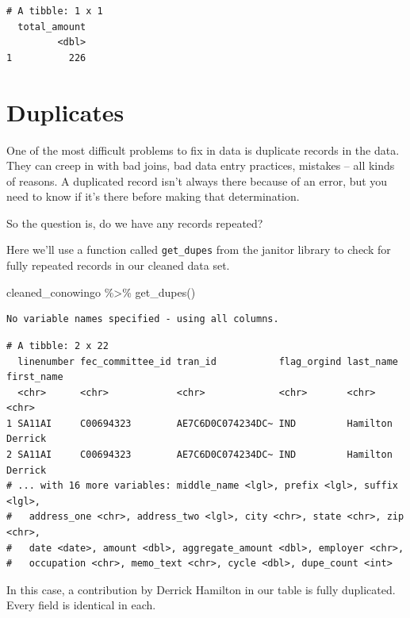 \documentclass[
  letterpaper,
  DIV=11,
  numbers=noendperiod]{scrreprt}
\newenvironment{Shaded}{\begin{snugshade}}{\end{snugshade}}
\newcommand{\FunctionTok}[1]{\textcolor[rgb]{0.28,0.35,0.67}{#1}}
\newcommand{\NormalTok}[1]{\textcolor[rgb]{0.00,0.23,0.31}{#1}}
\newcommand{\SpecialCharTok}[1]{\textcolor[rgb]{0.37,0.37,0.37}{#1}}
\begin{document}
\begin{verbatim}
# A tibble: 1 x 1
  total_amount
         <dbl>
1          226
\end{verbatim}

\hypertarget{duplicates}{%
\section{Duplicates}\label{duplicates}}

One of the most difficult problems to fix in data is duplicate records
in the data. They can creep in with bad joins, bad data entry practices,
mistakes -- all kinds of reasons. A duplicated record isn't always there
because of an error, but you need to know if it's there before making
that determination.

So the question is, do we have any records repeated?

Here we'll use a function called \texttt{get\_dupes} from the janitor
library to check for fully repeated records in our cleaned data set.

\begin{Shaded}
\begin{Highlighting}[]
\NormalTok{cleaned\_conowingo }\SpecialCharTok{\%\textgreater{}\%} 
  \FunctionTok{get\_dupes}\NormalTok{()}
\end{Highlighting}
\end{Shaded}

\begin{verbatim}
No variable names specified - using all columns.
\end{verbatim}

\begin{verbatim}
# A tibble: 2 x 22
  linenumber fec_committee_id tran_id           flag_orgind last_name first_name
  <chr>      <chr>            <chr>             <chr>       <chr>     <chr>     
1 SA11AI     C00694323        AE7C6D0C074234DC~ IND         Hamilton  Derrick   
2 SA11AI     C00694323        AE7C6D0C074234DC~ IND         Hamilton  Derrick   
# ... with 16 more variables: middle_name <lgl>, prefix <lgl>, suffix <lgl>,
#   address_one <chr>, address_two <lgl>, city <chr>, state <chr>, zip <chr>,
#   date <date>, amount <dbl>, aggregate_amount <dbl>, employer <chr>,
#   occupation <chr>, memo_text <chr>, cycle <dbl>, dupe_count <int>
\end{verbatim}

In this case, a contribution by Derrick Hamilton in our table is fully
duplicated. Every field is identical in each.
\end{document}
